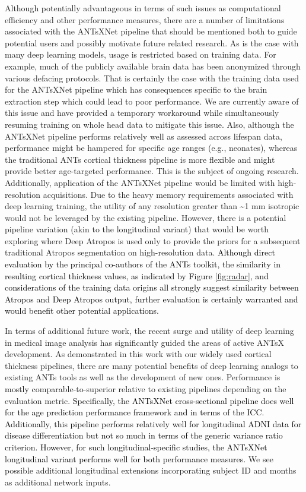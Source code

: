 \documentclass[
  12pt,
]{article}
\begin{document}
Although potentially advantageous in terms of such issues as
computational efficiency and other performance measures, there are a
number of limitations associated with the ANTsXNet pipeline that should
be mentioned both to guide potential users and possibly motivate future
related research. As is the case with many deep learning models, usage
is restricted based on training data. For example, much of the publicly
available brain data has been anonymized through various defacing
protocols. That is certainly the case with the training data used for
the ANTsXNet pipeline which has consequences specific to the brain
extraction step which could lead to poor performance. We are currently
aware of this issue and have provided a temporary workaround while
simultaneously resuming training on whole head data to mitigate this
issue. Also, although the ANTsXNet pipeline performs relatively well as
assessed across lifespan data, performance might be hampered for
specific age ranges (e.g., neonates), whereas the traditional ANTs
cortical thickness pipeline is more flexible and might provide better
age-targeted performance. This is the subject of ongoing research.
Additionally, application of the ANTsXNet pipeline would be limited with
high-resolution acquisitions. Due to the heavy memory requirements
associated with deep learning training, the utility of any resolution
greater than \textasciitilde1 mm isotropic would not be leveraged by the
existing pipeline. However, there is a potential pipeline variation
(akin to the longitudinal variant) that would be worth exploring where
Deep Atropos is used only to provide the priors for a subsequent
traditional Atropos segmentation on high-resolution data.
\textcolor{black}{Although direct
evaluation by the principal co-authors of the ANTs toolkit, the similarity
in resulting cortical thickness values, as indicated by Figure \ref{fig:radar},
and considerations of the training data origins all strongly suggest similarity
between Atropos and Deep Atropos output, further evaluation is certainly warranted
and would benefit other potential applications.}

In terms of additional future work, the recent surge and utility of deep
learning in medical image analysis has significantly guided the areas of
active ANTsX development. As demonstrated in this work with our widely
used cortical thickness pipelines, there are many potential benefits of
deep learning analogs to existing ANTs tools as well as the development
of new ones. Performance is \textcolor{black}{mostly}
comparable-to-superior relative to existing pipelines depending on the
evaluation metric. \textcolor{black}{Specifically, the ANTsXNet
cross-sectional pipeline does well for the age prediction performance framework
and in terms of the ICC.  Additionally, this pipeline performs relatively well
for longitudinal ADNI data for disease differentiation but not so much in terms
of the generic variance ratio criterion.  However, for such longitudinal-specific
studies, the ANTsXNet longitudinal variant performs well for both performance
measures.} We see possible additional longitudinal extensions
incorporating subject ID and months as additional network inputs.
\end{document}
